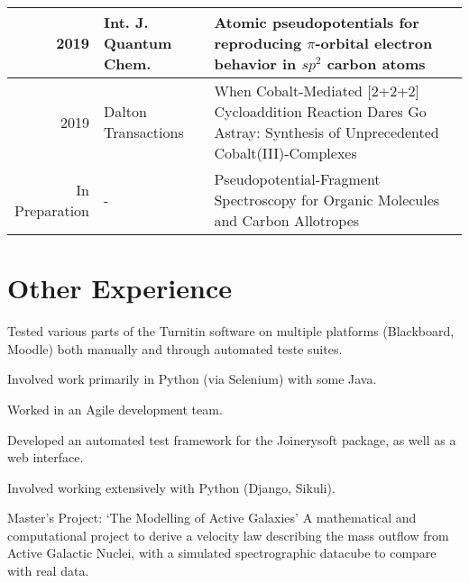 \documentclass[letterpaper]{deedy-resume} %
\begin{document}
\begin{minipage}[t]{0.66\textwidth}
\begin{tabular}{rlm{7cm}}
2019 & Int. J. Quantum Chem. & Atomic pseudopotentials for reproducing $\pi$-orbital electron behavior in $sp^2$ carbon atoms \\
\hline
2019 & Dalton Transactions & When Cobalt-Mediated [2+2+2] Cycloaddition Reaction Dares Go Astray: Synthesis of Unprecedented  Cobalt(III)-Complexes \\
\hline
\makecell{In \\ Preparation} & - & Pseudopotential-Fragment Spectroscopy for Organic Molecules and Carbon Allotropes
\end{tabular}

\sectionspace %


\section{Other Experience}


\begin{tightitemize}
\item Tested various parts of the Turnitin software on multiple platforms (Blackboard, Moodle) both manually and through automated teste suites.
\item Involved work primarily in Python (via Selenium) with some Java.
\item Worked in an Agile development team.
\end{tightitemize}

\sectionspace %




\begin{tightitemize}
\item Developed an automated test framework for the Joinerysoft package, as well as a web interface.
\item Involved working extensively with Python (Django, Sikuli).
\end{tightitemize}

\sectionspace %



\begin{tightitemize}
\item Master's Project: `The Modelling of Active Galaxies' A mathematical and computational project to derive a velocity law describing the mass outflow from Active Galactic Nuclei, with a simulated spectrographic datacube to compare with real data.
\end{tightitemize}

\end{minipage}
\end{document}
